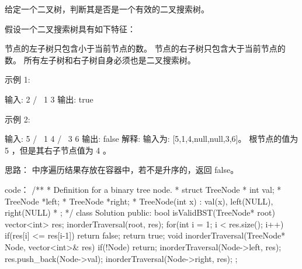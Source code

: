 给定一个二叉树，判断其是否是一个有效的二叉搜索树。

假设一个二叉搜索树具有如下特征：

    节点的左子树只包含小于当前节点的数。
    节点的右子树只包含大于当前节点的数。
    所有左子树和右子树自身必须也是二叉搜索树。

示例 1:

输入:
    2
   / \
  1   3
输出: true

示例 2:

输入:
    5
   / \
  1   4
     / \
    3   6
输出: false
解释: 输入为: [5,1,4,null,null,3,6]。
     根节点的值为 5 ，但是其右子节点值为 4 。























思路：
中序遍历结果存放在容器中，若不是升序的，返回 false。























code：
/**
 * Definition for a binary tree node.
 * struct TreeNode {
 *     int val;
 *     TreeNode *left;
 *     TreeNode *right;
 *     TreeNode(int x) : val(x), left(NULL), right(NULL) {}
 * };
 */
class Solution {
public:
    bool isValidBST(TreeNode* root) {
        vector<int> res;
        inorderTraversal(root, res);
        for(int i = 1; i < res.size(); i++)
        {
            if(res[i] <= res[i-1]) return false;
        }
        return true;
    }
    void inorderTraversal(TreeNode* Node, vector<int>& res)
    {
        if(!Node) return;
        inorderTraversal(Node->left, res);
        res.push_back(Node->val);
        inorderTraversal(Node->right, res);
    }
};